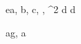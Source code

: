 \begin{eqcode}{e}{a, b, c}{, , ^2}{}
  d \in {} \lend
  d \gets {} \lend %

\end{eqcode}

\begin{eqcode}{a}{g, a }{}{} %
  
\end{eqcode}
